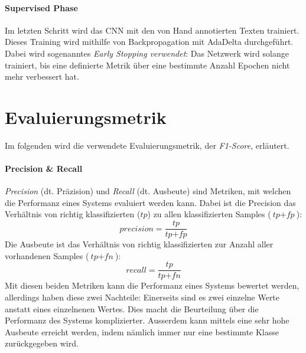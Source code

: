 
\paragraph{Supervised Phase} Im letzten Schritt wird das CNN mit den von Hand annotierten Texten trainiert. Dieses Training wird mithilfe von Backpropagation mit AdaDelta durchgeführt. Dabei wird sogenanntes \emph{Early Stopping verwendet}: Das Netzwerk wird solange trainiert, bis eine definierte Metrik über eine bestimmte Anzahl Epochen nicht mehr verbessert hat.

\section{Evaluierungsmetrik}
Im folgenden wird die verwendete Evaluierungsmetrik, der \emph{F1-Score}, erläutert.

\paragraph{Precision {\&} Recall} \emph{Precision} (dt. Präzision) und \emph{Recall} (dt. Ausbeute) sind Metriken, mit welchen die Performanz eines Systems evaluiert werden kann. Dabei ist die Precision das Verhältnis von richtig klassifizierten ($\textit{tp}$) zu allen klassifizierten Samples ($\textit{tp} + \textit{fp}$):
\begin{equation}
\textit{precision} = \frac{\textit{tp}}{\textit{tp} + \textit{fp}}
\end{equation}
Die Ausbeute ist das Verhältnis von richtig klassifizierten zur Anzahl aller vorhandenen Samples ($\textit{tp} + \textit{fn}$):
\begin{equation}
recall = \frac{\textit{tp}}{\textit{tp} + \textit{fn}}
\end{equation}
Mit diesen beiden Metriken kann die Performanz eines Systems bewertet werden, allerdings haben diese zwei Nachteile: Einerseits sind es zwei einzelne Werte anstatt eines einzelnenen Wertes. Dies macht die Beurteilung über die Performanz des Systems komplizierter. Ausserdem kann mittels  eine sehr hohe Ausbeute erreicht werden, indem nämlich immer nur eine bestimmte Klasse zurückgegeben wird.
